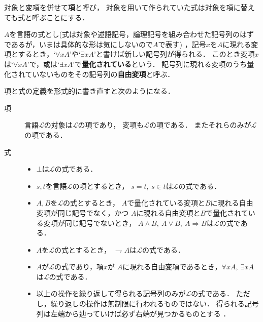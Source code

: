 	対象と変項を併せて{\bf 項}と呼び，
	対象を用いて作られていた式は対象を項に替えても式と呼ぶことにする．
	
	\begin{screen}
		\begin{dfn}[量化]
			$A$を言語の式とし(式は対象や述語記号，論理記号を組み合わせた記号列のはずであるが，いまは具体的な形は気にしないので$A$で表す)
			，記号$x$を$A$に現れる変項とするとき，`$\forall x A$'や`$\exists x A$'と書けば新しい記号列が得られる．
			このとき変項$x$は`$\forall x A$'で，或は`$\exists x A$'で{\bf 量化されている}という．
			記号列に現れる変項のうち量化されていないものをその記号列の{\bf 自由変項}と呼ぶ．
		\end{dfn}
	\end{screen}
	
	項と式の定義を形式的に書き直すと次のようになる．
	\begin{description}
		\item[項] 言語$\mathcal{L}$の対象は$\mathcal{L}$の項であり，
			変項も$\mathcal{L}$の項である．
			またそれらのみが$\mathcal{L}$の項である．
			
		\item[式] 
			\begin{itemize}
				\item $\bot$は$\mathcal{L}$の式である．
				
				\item $s,t$を言語$\mathcal{L}$の項とするとき，
					$s=t,\ s \in t$は$\mathcal{L}$の式である．
					
				\item $A,B$を$\mathcal{L}$の式とするとき，
					$A$で量化されている変項と$B$に現れる自由変項が同じ記号でなく，かつ
					$A$に現れる自由変項と$B$で量化されている変項が同じ記号でないとき，
					$A \wedge B,\ A \vee B,\ A\Longrightarrow B$は$\mathcal{L}$の式である．
				
				\item $A$を$\mathcal{L}$の式とするとき，
					$\rightharpoondown A$は$\mathcal{L}$の式である．
				
				\item $A$が$\mathcal{L}$の式であり，項$x$が
					$A$に現れる自由変項であるとき，$\forall x A,\ \exists x A$は$\mathcal{L}$の式である．
				
				\item 以上の操作を繰り返して得られる記号列のみが$\mathcal{L}$の式である．
					ただし，繰り返しの操作は無制限に行われるものではない．
					得られる記号列は左端から辿っていけば必ず右端が見つかるものとする
					\footnotemark．
			\end{itemize}
	\end{description}
	
